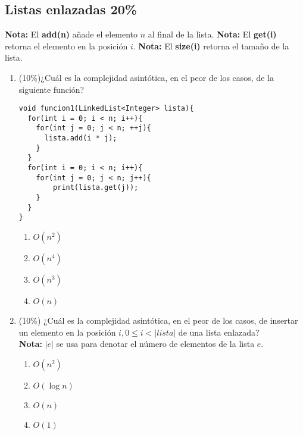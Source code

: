 \documentclass[10 pt]{article}
\begin{document}
\begin{multicols}{2}
\section{Listas enlazadas 20\%}
\textbf{Nota: } El \textbf{add(n)} añade el elemento $n$ al final de la lista.
\textbf{Nota: } El \textbf{get(i)} retorna el elemento en la posición $i$.
\textbf{Nota: } El \textbf{size(i)} retorna el tamaño de la lista.
\begin{enumerate}[label=\alph*]
\item (10\%)¿Cuál es la complejidad asintótica, en el peor de los casos, de la siguiente función?
\begin{lstlisting}
void funcion1(LinkedList<Integer> lista){
  for(int i = 0; i < n; i++){
    for(int j = 0; j < n; ++j){
      lista.add(i * j);    
    }  
  }
  for(int i = 0; i < n; i++){
    for(int j = 0; j < n; j++){    
        print(lista.get(j));            
    }  
  }
}
\end{lstlisting}
\begin{enumerate}[label=(\roman*)]
\item $O(n^2)$
\item $O(n^4)$
\item $O(n^3)$
\item $O(n)$
\end{enumerate}
\item (10\%) ¿Cuál es la complejidad asintótica, en el peor de los casos, de insertar un elemento en la posición $i, 0\leq i < |lista|$ de una lista enlazada?
\\
\textbf{Nota: } $|e|$ se usa para denotar el número de elementos de la lista $e$. 
\begin{enumerate}[label=(\roman*)]
\item $O(n^2)$
\item $O(\log n)$
\item $O(n)$
\item $O(1)$ 
\end{enumerate}
\end{enumerate}
\end{multicols}
\end{document}
